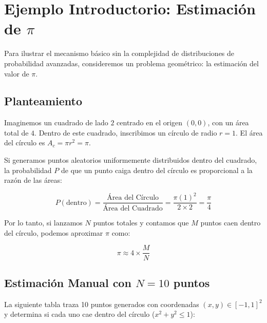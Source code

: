 \documentclass[11pt, letterpaper]{article}
\begin{document}
\section{Ejemplo Introductorio: Estimación de $\pi$}

Para ilustrar el mecanismo básico sin la complejidad de distribuciones de probabilidad avanzadas, consideremos un problema geométrico: la estimación del valor de $\pi$.

\subsection{Planteamiento}
Imaginemos un cuadrado de lado $2$ centrado en el origen $(0,0)$, con un área total de $4$. Dentro de este cuadrado, inscribimos un círculo de radio $r=1$. El área del círculo es $A_c = \pi r^2 = \pi$.

Si generamos puntos aleatorios uniformemente distribuidos dentro del cuadrado, la probabilidad $P$ de que un punto caiga dentro del círculo es proporcional a la razón de las áreas:

\begin{equation}
    P(\text{dentro}) = \frac{\text{Área del Círculo}}{\text{Área del Cuadrado}} = \frac{\pi (1)^2}{2 \times 2} = \frac{\pi}{4}
\end{equation}

Por lo tanto, si lanzamos $N$ puntos totales y contamos que $M$ puntos caen dentro del círculo, podemos aproximar $\pi$ como:

\begin{equation}
    \pi \approx 4 \times \frac{M}{N}
\end{equation}

\subsection{Estimación Manual con $N=10$ puntos}

La siguiente tabla traza 10 puntos generados con coordenadas $(x, y) \in [-1,1]^2$ y determina si cada uno cae dentro del círculo ($x^2 + y^2 \le 1$):
\end{document}
